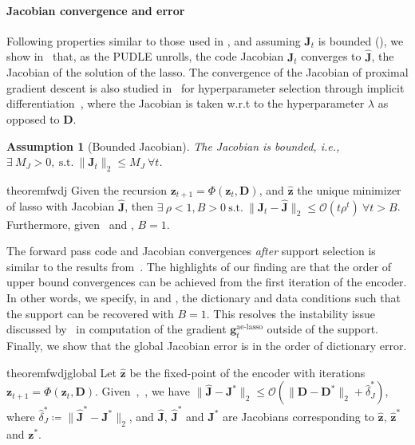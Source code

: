 \documentclass[10pt]{article} %
\newtheorem{assumption}{Assumption}[section]
\newcommand{\D}{{\bm D}}
\newcommand{\J}{{\bm J}}
\newcommand{\z}{{\bm z}}
\newcommand{\g}{{\bm g}}
\begin{document}
\paragraph{Jacobian convergence and error}  Following properties similar to those used in , and assuming $\J_t$ is bounded (), we show in~ that, as the PUDLE unrolls, the code Jacobian $\J_t$ converges to $\hat \J$, the Jacobian of the solution of the lasso. The convergence of the Jacobian of proximal gradient descent is also studied in~\citep{bertrand2021implicit} for hyperparameter selection through implicit differentiation~\citep{bengio2000gradient}, where the Jacobian is taken w.r.t to the hyperparameter $\lambda$ as opposed to $\D$.
%
\begin{assumption}[Bounded Jacobian]\label{assum:boundj}
The Jacobian is bounded, i.e., $\exists\ M_J >0,\ \text{s.t.}\ \| \J_t \|_2 \leq M_J\ \forall t$.
\end{assumption}
%
\begin{restatable}{theorem}{fwdj}\label{thm:fwdj}
Given the recursion $\z_{t+1} = \Phi(\z_t, \D)$, and $\hat \z$ the unique minimizer of lasso with Jacobian $\hat \J$, then $\exists\ \rho <1, B > 0\ \text{s.t.}\ \| \J_{t} - \hat \J \|_2 \leq \mathcal{O}(t \rho^{t})\ \forall t > B$. Furthermore, given~ and , $B = 1$.
\end{restatable}
%
The forward pass code and Jacobian convergences \emph{after} support selection is similar to the results from~\citep{malezieux2022understanding}. The highlights of our finding are that the order of upper bound convergences can be achieved from the first iteration of the encoder. In other words, we specify, in  and , the dictionary and data conditions such that the support can be recovered with $B=1$. This resolves the instability issue discussed by~\citet{malezieux2022understanding} in computation of the gradient $\g_t^{\text{ae-lasso}}$ outside of the support. Finally, we show that the global Jacobian error is in the order of dictionary error.
%
\begin{restatable}{theorem}{fwdjglobal}\label{thm:fwdjglobal}
Let $\hat \z$ be the fixed-point of the encoder with iterations $\z_{t+1} = \Phi(\z_{t}, \D)$. Given~,~, we have $\| \hat \J - \J^{\ast} \|_2  \leq \mathcal{O}(\| \D - \D^{\ast} \|_2 + \hat \delta_J^{\ast})$, where $\hat \delta_J^{\ast} \coloneqq \| \hat \J^{\ast} - \J^{\ast} \|_2$, and $\hat \J$, $\hat \J^{\ast}$ and $\J^{\ast}$ are Jacobians corresponding to $\hat \z$, $\hat \z^{\ast}$ and $\z^{\ast}$.
\end{restatable}
\end{document}
